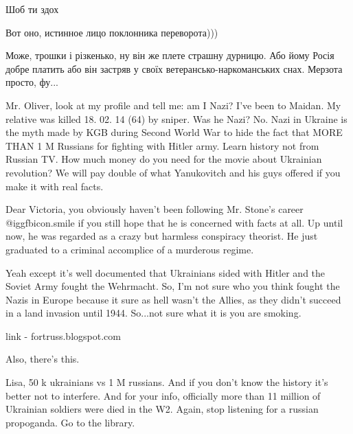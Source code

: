 \begin{itemize}
\begin{itemize}
\end{itemize} %

Шоб ти здох

\begin{itemize} %
Вот оно, истинное лицо поклонника переворота)))


Може, трошки і різкенько, ну він же плете страшну дурницю. Або йому Росія добре
платить або він застряв у своїх ветерансько-наркоманських снах. Мерзота просто,
фу...

\end{itemize} %


Mr. Oliver, look at my profile and tell me: am I Nazi? I've been to Maidan. My
relative was killed 18. 02. 14 (64) by sniper. Was he Nazi? No. Nazi in Ukraine
is the myth made by KGB during Second World War to hide the fact that MORE THAN
1 M Russians for fighting with Hitler army. Learn history not from Russian TV.
How much money do you need for the movie about Ukrainian revolution? We will
pay double of what Yanukovitch and his guys offered if you make it with real
facts.

\begin{itemize} %

Dear Victoria, you obviously haven't been following Mr. Stone's career  @igg{fbicon.smile}  if
you still hope that he is concerned with facts at all. Up until now, he was
regarded as a crazy but harmless conspiracy theorist. He just graduated to a
criminal accomplice of a murderous regime.


Yeah except it's well documented that Ukrainians sided with Hitler and the
Soviet Army fought the Wehrmacht. So, I'm not sure who you think fought the
Nazis in Europe because it sure as hell wasn't the Allies, as they didn't
succeed in a land invasion until 1944. So...not sure what it is you are
smoking.


link - fortruss.blogspot.com

Also, there's this.


Lisa, 50 k ukrainians vs 1 M russians. And if you don't know the history it's
better not to interfere. And for your info, officially more
than 11 million of Ukrainian soldiers were died in the W2.
Again, stop listening for a russian propoganda. Go to the
library.


\end{itemize}
\end{itemize}
